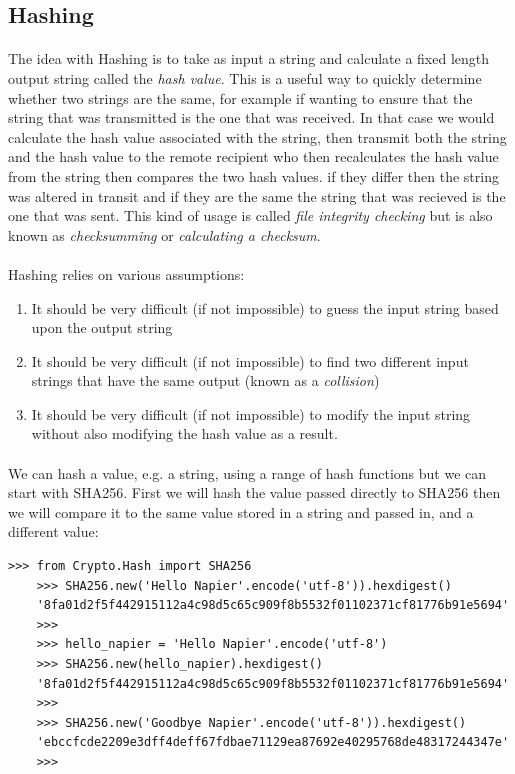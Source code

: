 \documentclass[12pt, a4paper, oneside]{book}
\begin{document}
{\subsection{Hashing}
\paragraph{} The idea with Hashing is to take as input a string and calculate a fixed length output string called the \emph{hash value}. This is a useful way to quickly determine whether two strings are the same, for example if wanting to ensure that the string that was transmitted is the one that was received. In that case we would calculate the hash value associated with the string, then transmit both the string and the hash value to the remote recipient who then recalculates the hash value from the string then compares the two hash values. if they differ then the string was altered in transit and if they are the same the string that was recieved is the one that was sent. This kind of usage is called \emph{file integrity checking} but is also known as \emph{checksumming} or \emph{calculating a checksum}.

\paragraph{} Hashing relies on various assumptions:

\begin{enumerate}
\item It should be very difficult (if not impossible) to guess the input string based upon the output string
\item It should be very difficult (if not impossible) to find two different input strings that have the same output (known as a \emph{collision})
\item It should be very difficult (if not impossible) to modify the input string without also modifying the hash value as a result.
\end{enumerate}

\paragraph{} We can hash a value, e.g. a string, using a range of hash functions but we can start with SHA256. First we will hash the value passed directly to SHA256 then we will compare it to the same value stored in a string and passed in, and a different value:

\begin{lstlisting}[style=DOS]
    >>> from Crypto.Hash import SHA256
    >>> SHA256.new('Hello Napier'.encode('utf-8')).hexdigest()
    '8fa01d2f5f442915112a4c98d5c65c909f8b5532f01102371cf81776b91e5694'
    >>>
    >>> hello_napier = 'Hello Napier'.encode('utf-8')
    >>> SHA256.new(hello_napier).hexdigest()
    '8fa01d2f5f442915112a4c98d5c65c909f8b5532f01102371cf81776b91e5694'
    >>> 
    >>> SHA256.new('Goodbye Napier'.encode('utf-8')).hexdigest()
    'ebccfcde2209e3dff4deff67fdbae71129ea87692e40295768de48317244347e'
    >>>
\end{lstlisting}

}
\end{document}
